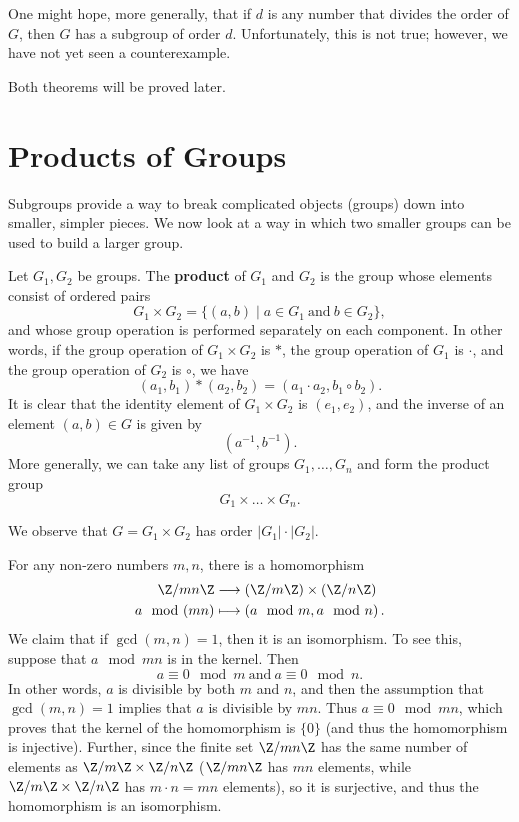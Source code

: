 \documentclass[math1530-lecture-notes]{subfiles}
\begin{document}
One might hope, more generally, that if $d$ is any number that divides the order of $G$, then $G$
has a subgroup of order $d$. Unfortunately, this is not true; however, we have not yet seen a
counterexample. 

Both theorems will be proved later.


\section{Products of Groups}
Subgroups provide a way to break complicated objects (groups) down into smaller, simpler pieces. We
now look at a way in which two smaller groups can be used to build a larger group.

\begin{definition}{}
  Let $G_1,G_2$ be groups. The \textbf{product} of $G_1$ and $G_2$ is the group whose elements
  consist of ordered pairs \[
    G_1 \times G_2 = \{(a,b)\mid a\in G_1 ~\text{and}~b\in G_2\} 
  ,\] and whose group operation is performed separately on each component. In other words, if the
  group operation of $G_1\times G_2$ is $*$, the group operation of $G_1$ is $\cdot $, and the 
  group operation of $ G_2$ is $\circ $, we have \[
    (a_1,b_1) * (a_2,b_2) = (a_1\cdot a_2,b_1\circ b_2)
  .\] It is clear that the identity element of $G_1\times G_2$ is $(e_1,e_2)$, and the inverse of an
  element $(a,b)\in G$ is given by \[
    (a^{-1},b^{-1}).
  \] More generally, we can take any list of groups $ G_1,\ldots,G_n$ and form the product group \[
  G_1 \times  \ldots \times G_n 
  .\] 
\end{definition}
\begin{remark}
  We observe that $G=G_1\times G_2$ has order $\left| G_1 \right| \cdot \left| G_2 \right| $.
\end{remark}

\begin{example}
  For any non-zero numbers $m,n$, there is a homomorphism
  \begin{align*}
    \Z / mn\Z &\longrightarrow \left( \Z / m\Z \right) \times \left( \Z / n\Z \right)  \\
    a\mod(mn) &\longmapsto \left( a\mod m,a\mod n \right) 
  .\end{align*}
  We claim that if $\gcd{\left(m,n\right)}=1$, then it is an isomorphism. To see this, suppose that
  $a\mod{mn}$ is in the kernel. Then \[
    a\equiv 0\mod{m} ~\text{and}~ a\equiv 0\mod{n}
  .\] In other words, $a$ is divisible by both $m$ and $n$, and then the assumption that
  $\gcd{(m,n)}=1$ implies that $a$ is divisible by $mn$. Thus $a\equiv 0\mod{mn}$, which proves that
  the kernel of the homomorphism is $\{ 0 \}$ (and thus the homomorphism is injective). Further,
  since the finite set $\Z / mn\Z$ has the same number of elements as $\Z / m\Z \times \Z / n\Z$
  ($\Z / mn\Z$ has $mn$ elements, while $\Z / m\Z \times \Z / n\Z$ has $m \cdot n = mn$ elements),
  so it is surjective, and thus the homomorphism is an isomorphism.
\end{example}
\end{document}
